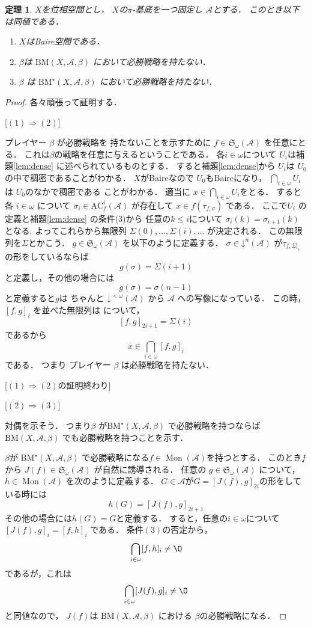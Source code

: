 \documentclass[leqno, 12pt]{jsarticle}
\newtheorem{thm}{定理}
\newcommand{\To}{\Longrightarrow}
\DeclareMathOperator{\mon}{Mon}
\newcommand{\mycal}[1]{\mathcal{#1}}
\newcommand{\mydn}[2]{\mathord{\downarrow}^{#1}(#2)}
\newcommand{\mysen}[2]{\mathfrak{S}_{#1}(#2)}
\newcommand{\myka}[3]{[#1, #2]_{#3}}
\newcommand{\mybm}[3]{\mathrm{BM}(#1, #2, #3)}
\newcommand{\mybmb}[3]{\mathrm{BM}^{\star}(#1, #2, #3)}
\newcommand{\myac}[3]{\mathrm{AC}_{#1}^{#3}(#2)}
\newcommand{\myom}{\omega}
\begin{document}
\begin{thm}\label{thm:aaa}
$X$を位相空間とし，
$X$の$\pi$-基底を一つ固定し
$\mycal{A}$とする．
このとき以下は同値である．
\begin{enumerate}
\item 
$X$はBaire空間である．
\item 

$\beta$は
$\mybm{X}{\mycal{A}}{\beta}$
において必勝戦略を持たない．
\item 
$\beta$
は
$\mybmb{X}{\mycal{A}}{\beta}$
において必勝戦略を持たない．
\end{enumerate}
\end{thm}
\begin{proof}
各々頑張って証明する．

[$(1)\To (2)$]

プレイヤー
$\beta$
が必勝戦略を
持たないことを示すために
$f\in \mysen{\myom}{\mycal{A}}$
を任意にとる．
これは$\beta$の戦略を任意に与えるということである．
各$i\in \myom$について
$U_{i}は$補題\ref{lem:dense}
に述べられているものとする．
すると補題\ref{lem:dense}から
$U_{i}$は
$U_{0}$
の中で稠密であることがわかる．
$X$がBaireなので
$U_{0}$もBaireになり，
$\bigcap_{i\in \myom}U_{i}$は
$U_{0}$のなかで稠密である
ことがわかる．
適当に
$x\in \bigcap_{i\in \myom} U_{i}$をとる．
すると各
$i\in \myom$
について
$\sigma_{i}\in \myac{f}{\mycal{A}}{i}$
が存在して
$x\in f(\tau_{f, \sigma})$
である．
ここで$U_{i}$
の定義と補題\ref{lem:dense}
の条件(3)から
任意の$k\le i$について
$\sigma_{i}(k)=\sigma_{i+1}(k)$
となる.
よってこれらから無限列
$\Sigma(0),\dots, \Sigma(i), \dots$
が決定される．
この無限列を$\Sigma$とかこう．
$g\in \mysen{\myom}{\mycal{A}}$
を以下のように定義する．
$\sigma\in \mydn{n}{\mycal{A}}$
が$\tau_{f, \Sigma|_{i}}$の形をしているならば
\[
g(\sigma)=\Sigma(i+1)
\]
と定義し，その他の場合には
\[
g(\sigma)=\sigma(n-1)
\]
と定義すると$g$は
ちゃんと
$\mydn{<\myom}{\mycal{A}}$
から
$\mycal{A}$
への写像になっている．
この時，
$\myka{f}{g}{i}$
を並べた無限列は
について，
\[
\myka{f}{g}{2i+1}=\Sigma(i)
\]
であるから
\[
x\in \bigcap_{i\in \myom}
\myka{f}{g}{i}
\]
である．
つまり
プレイヤー
$\beta$
は必勝戦略を持たない．


[$(1)\To (2)$の証明終わり]



[$(2)\To (3)$]

対偶を示そう．
つまり$\beta$
が$\mybmb{X}{\mycal{A}}{\beta}$
で必勝戦略を持つならば
$\mybm{X}{\mycal{A}}{\beta}$
でも必勝戦略を持つことを示す．

$\beta$が
$\mybmb{X}{\mycal{A}}{\beta}$
で必勝戦略になる$f\in \mon(\mathcal{A})$を持つとする．
このとき$f$から
$J(f)\in \mathfrak{S}_{\omega}(\mathcal{A})$
が自然に誘導される．
任意の
$g\in \mathfrak{S}_{\omega}(\mathcal{A})$
について，
$h\in \mon(\mathcal{A})$
を次のように定義する．
$G\in \mathcal{A}$が$G=[J(f), g]_{2i}$の形をしている時には
\[
h(G)=[J(f), g]_{2i+1}
\]
その他の場合には$h(G)=G$と定義する．
すると，任意の$i\in \myom$について
$[J(f), g]_i=[f, h]_i$
である．
条件$(3)$の否定から，
\[
\bigcap_{i\in \myom}[f, h]_i\neq \O
\]
であるが，これは
\[
\bigcap_{i\in \myom}[J(f), g]_i\neq \O
\]
と同値なので，
$J(f)$は
$\mybm{X}{\mycal{A}}{\beta}$
における
$\beta$の必勝戦略になる．



\end{proof}
\end{document}

